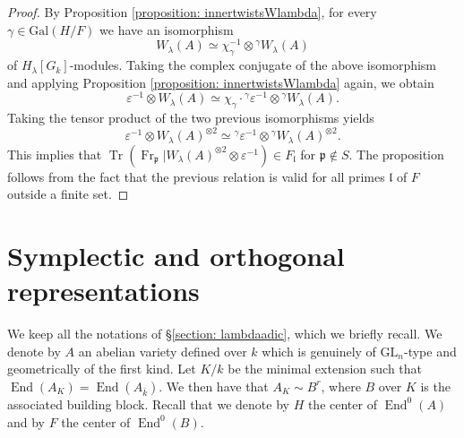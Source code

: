 \documentclass[oneside]{amsart}
\theoremstyle{remark}
\newcommand{\Gal}{\mathrm{Gal}}
\newcommand{\GL}{\mathrm{GL}}
\newcommand{\End}{\operatorname{End}}
\newcommand{\Frob}{\operatorname{Fr}}
\newcommand{\p}{\mathfrak{p}}
\newcommand{\Tr}{\operatorname{Tr}}
\newcommand{\gl}{\mathfrak{l}}
\numberwithin{equation}{section}
\begin{document}
\begin{proof}
By Proposition \ref{proposition: innertwistsWlambda}, for every $\gamma\in \Gal(H/F)$ we have an isomorphism
$$
W_{\lambda}(A) \simeq \chi_{\gamma}^{-1} \otimes {}^\gamma W_{\lambda}(A)
$$
of $H_\lambda[G_k]$-modules. Taking the complex conjugate of the above isomorphism and applying Proposition \ref{proposition: innertwistsWlambda} again, we obtain
$$
\varepsilon^{-1}\otimes W_{\lambda}(A) \simeq \chi_{\gamma}\cdot {}^\gamma\varepsilon^{-1} \otimes {}^\gamma W_{\lambda}(A).
$$
Taking the tensor product of the two previous isomorphisms yields
$$
\varepsilon^{-1}\otimes W_{\lambda}(A)^{\otimes 2} \simeq  {}^\gamma\varepsilon^{-1} \otimes {}^\gamma W_{\lambda}(A)^{\otimes 2}.
$$
This implies that $\Tr(\Frob_\p|W_{\lambda}(A)^{\otimes 2}\otimes \varepsilon^{-1})\in F_\gl$ for $\p \not \in S$. The proposition follows from the fact that the previous relation is valid for all primes $\gl$ of $F$ outside a finite set.


\end{proof}




\section{Symplectic and orthogonal representations}\label{section: symplective vs orthogonal}

We keep all the notations of \S\ref{section: lambdaadic}, which we briefly recall. We denote by $A$ an abelian variety defined over $k$ which is genuinely of $\GL_n$-type and geometrically of the first kind. Let $K/k$ be the minimal extension such that $\End(A_K) = \End(A_{\bar k})$. We then have that $A_K\sim B^r$, where $B$ over $K$ is the associated building block. Recall that we denote by $H$ the center of $\End^0(A)$ and by $F$ the center of $\End^0(B)$.
\end{document}
